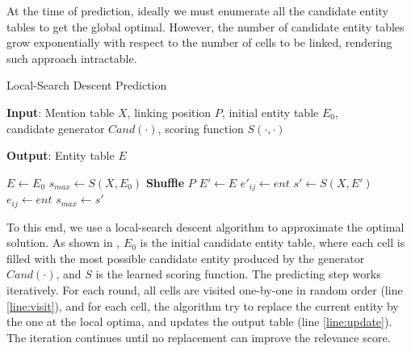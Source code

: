 At the time of prediction, ideally we must enumerate all the candidate entity 
tables to get the global optimal.
However, the number of candidate entity tables grow exponentially
with respect to the number of cells to be linked,
rendering such approach intractable.
%
%
\begin{algorithm}
	\small
	\caption{Local-Search Descent Prediction}
	\label{alg:prediction}
	\textbf{Input}: Mention table $X$, linking position $P$, initial entity table $E_0$,\\
	candidate generator $Cand(\cdot)$, scoring function $S(\cdot,\cdot)$

	\textbf{Output}: Entity table $E$
	\begin{algorithmic}[1]
		\State $E \gets E_0$
		\State $s_{max} \gets S(X, E_0)$
		\Repeat
            \State \textbf{Shuffle} $P$
    		 \label{line:visit}
	    	    \State $E' \gets E$
                    \State $e'_{ij} \gets ent$
		            \State $s' \gets S(X, E')$
                        \State $e_{ij} \gets ent$ \label{line:update}
                        \State $s_{max} \gets s'$
		            \EndIf
       		    \EndFor
		    \EndFor
		\State {}
		\EndProcedure
	\end{algorithmic}
\end{algorithm}
To this end, we use a local-search descent algorithm to approximate the optimal
solution.
As shown in ,
$E_0$ is the initial candidate entity table, where each cell is filled with
the most possible candidate entity produced by the generator $Cand(\cdot)$,
and $S$ is the learned scoring function.
The predicting step works iteratively.
For each round, all cells are visited one-by-one in random order 
(line \ref{line:visit}),
and for each cell, the algorithm try to replace the current entity by 
the one at the local optima,
and updates the output table (line \ref{line:update}).
The iteration continues until no replacement can improve the relevance score.

